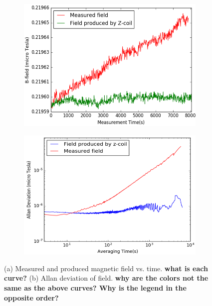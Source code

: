 \begin{figure}
  \centering
  \begin{subfigure}[b]{0.65\textwidth}
    \centering
    \includegraphics[width=\textwidth]{figures/field_coil_current.png}
    \caption{}
    \label{fig:field_measure_and_produced}
  \end{subfigure}
  \begin{subfigure}[b]{0.65\textwidth}
    \centering
    \includegraphics[width=\textwidth]{figures/field_current_allan_plot.png}
    \caption{}
    \label{fig:allan_plot}
  \end{subfigure}
  \caption{(a) Measured and produced magnetic field vs. time. {\bf
      what is each curve?}  (b) Allan deviation of field. {\bf why are
      the colors not the same as the above curves?  Why is the legend
      in the opposite order?}}
  \label{fig:current_vs_field_allan_deviation}
\end{figure} 

